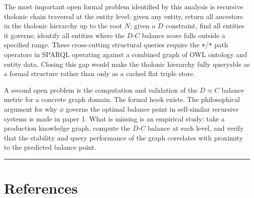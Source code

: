 \documentclass[12pt]{article}
\begin{document}
The most important open formal problem identified by this analysis is
recursive tholonic chain traversal at the entity level: given any
entity, return all ancestors in the tholonic hierarchy up to the root
\(N\); given a \(D\) constraint, find all entities it governs; identify
all entities where the \(D\)-\(C\) balance score falls outside a
specified range. These cross-cutting structural queries require the
\texttt{+}/\texttt{*} path operators in SPARQL operating against a
combined graph of OWL ontology and entity data. Closing this gap would
make the tholonic hierarchy fully queryable as a formal structure rather
than only as a cached flat triple store.

A second open problem is the computation and validation of the
\(D \approx C\) balance metric for a concrete graph domain. The formal
hook exists. The philosophical argument for why \(\phi\) governs the
optimal balance point in self-similar recursive systems is made in paper
1. What is missing is an empirical study: take a production knowledge
graph, compute the \(D\)-\(C\) balance at each level, and verify that
the stability and query performance of the graph correlates with
proximity to the predicted balance point.

\begin{center}\rule{0.5\linewidth}{0.5pt}\end{center}

\section{References}\label{references}
\end{document}
